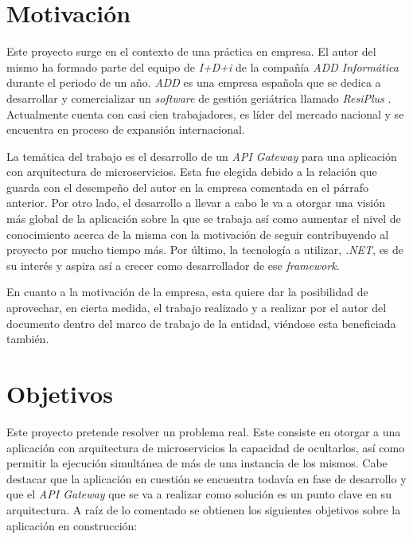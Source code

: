 \documentclass[11pt,spanish,listoffigures]{tfgetsinf}
\begin{document}
\section{Motivación}

Este proyecto surge en el contexto de una práctica en empresa. El autor del mismo ha formado parte del equipo de \emph{I+D+i} de la compañía \emph{ADD Informática} durante el periodo de un año. \emph{ADD} es una empresa española que se dedica a desarrollar y comercializar un \emph{software} de gestión geriátrica llamado \emph{ResiPlus} \cite{ResiPlus}. Actualmente cuenta con casi cien trabajadores, es líder del mercado nacional y se encuentra en proceso de expansión internacional.

La temática del trabajo es el desarrollo de un \emph{API Gateway} para una aplicación con arquitectura de microservicios. Esta fue elegida debido a la relación que guarda con el desempeño del autor en la empresa comentada en el párrafo anterior. Por otro lado, el desarrollo a llevar a cabo le va a otorgar una visión más global de la aplicación sobre la que se trabaja así como aumentar el nivel de conocimiento acerca de la misma con la motivación de seguir contribuyendo al proyecto por mucho tiempo más. Por último, la tecnología a utilizar, \emph{.NET}, es de su interés y aspira así a crecer como desarrollador de ese \emph{framework}.

En cuanto a la motivación de la empresa, esta quiere dar la posibilidad de aprovechar, en cierta medida, el trabajo realizado y a realizar por el autor del documento dentro del marco de trabajo de la entidad, viéndose esta beneficiada también.

\section{Objetivos}

Este proyecto pretende resolver un problema real. Este consiste en otorgar a una aplicación con arquitectura de microservicios la capacidad de ocultarlos, así como permitir la ejecución simultánea de más de una instancia de los mismos. Cabe destacar que la aplicación en cuestión se encuentra todavía en fase de desarrollo y que el \emph{API Gateway} que se va a realizar como solución es un punto clave en su arquitectura. A raíz de lo comentado se obtienen los siguientes objetivos sobre la aplicación en construcción:
\end{document}
